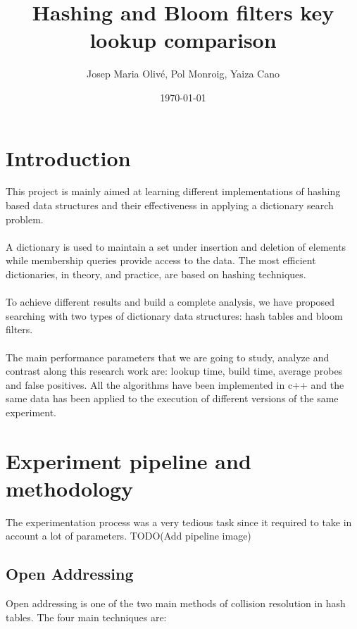 \documentclass{article}
\title{Hashing and Bloom filters key lookup comparison}
\author{Josep Maria Olivé, Pol Monroig, Yaiza Cano}
\date{\today}
\begin{document}
    \maketitle
    \thispagestyle{empty}
 
    \section{Introduction}
        This project is mainly aimed at learning different implementations of hashing based data structures and their effectiveness in applying a dictionary search problem. \\\\
A dictionary is used to maintain a set under insertion and deletion of elements while membership queries provide access to the data. The most efficient dictionaries, in theory, and practice, are based on hashing techniques. \\\\
To achieve different results and build a complete analysis, we have proposed searching with two types of dictionary data structures: hash tables and bloom filters. \\\\
The main performance parameters that we are going to study, analyze and contrast along this research work are: lookup time, build time, average probes and false positives.
All the algorithms have been implemented in c++ and the same data has been applied to the execution of different versions of the same experiment. 

    \section{Experiment pipeline and methodology}
        The experimentation process was a very tedious task since it required to take in account a lot of parameters. TODO(Add pipeline image)
        
\subsection{Open Addressing}
Open addressing is one of the two main methods of collision resolution in hash tables. The four main techniques are:
\end{document}

